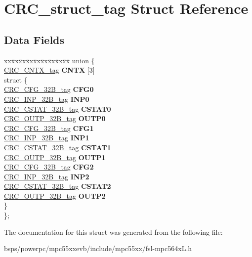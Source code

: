 \hypertarget{structCRC__struct__tag}{}\section{C\+R\+C\+\_\+struct\+\_\+tag Struct Reference}
\label{structCRC__struct__tag}
\subsection*{Data Fields}
\begin{DoxyCompactItemize}
\item 
\mbox{\label{structCRC__struct__tag_acde4a34d2fddee8ebc4445688481da3d}} 
\begin{tabbing}
xx\=xx\=xx\=xx\=xx\=xx\=xx\=xx\=xx\=\kill
union \{\\
\>\mbox{\hyperlink{structCRC__CNTX__struct__tag}{CRC\_CNTX\_tag}} {\bfseries CNTX} \mbox{[}3\mbox{]}\\
\mbox{\label{unionCRC__struct__tag_1_1_0D2026_adf32535cf2f76af47a79650669af9ba5}} 
\>struct \{\\
\>\>\mbox{\hyperlink{unionCRC__CFG__32B__tag}{CRC\_CFG\_32B\_tag}} {\bfseries CFG0}\\
\>\>\mbox{\hyperlink{unionCRC__INP__32B__tag}{CRC\_INP\_32B\_tag}} {\bfseries INP0}\\
\>\>\mbox{\hyperlink{unionCRC__CSTAT__32B__tag}{CRC\_CSTAT\_32B\_tag}} {\bfseries CSTAT0}\\
\>\>\mbox{\hyperlink{unionCRC__OUTP__32B__tag}{CRC\_OUTP\_32B\_tag}} {\bfseries OUTP0}\\
\>\>\mbox{\hyperlink{unionCRC__CFG__32B__tag}{CRC\_CFG\_32B\_tag}} {\bfseries CFG1}\\
\>\>\mbox{\hyperlink{unionCRC__INP__32B__tag}{CRC\_INP\_32B\_tag}} {\bfseries INP1}\\
\>\>\mbox{\hyperlink{unionCRC__CSTAT__32B__tag}{CRC\_CSTAT\_32B\_tag}} {\bfseries CSTAT1}\\
\>\>\mbox{\hyperlink{unionCRC__OUTP__32B__tag}{CRC\_OUTP\_32B\_tag}} {\bfseries OUTP1}\\
\>\>\mbox{\hyperlink{unionCRC__CFG__32B__tag}{CRC\_CFG\_32B\_tag}} {\bfseries CFG2}\\
\>\>\mbox{\hyperlink{unionCRC__INP__32B__tag}{CRC\_INP\_32B\_tag}} {\bfseries INP2}\\
\>\>\mbox{\hyperlink{unionCRC__CSTAT__32B__tag}{CRC\_CSTAT\_32B\_tag}} {\bfseries CSTAT2}\\
\>\>\mbox{\hyperlink{unionCRC__OUTP__32B__tag}{CRC\_OUTP\_32B\_tag}} {\bfseries OUTP2}\\
\>\} \\
\}; \\

\end{tabbing}\end{DoxyCompactItemize}


The documentation for this struct was generated from the following file\+:\begin{DoxyCompactItemize}
\item 
bsps/powerpc/mpc55xxevb/include/mpc55xx/fsl-\/mpc564x\+L.\+h\end{DoxyCompactItemize}
